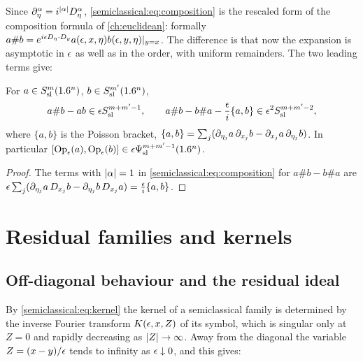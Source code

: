 Since $\partial^\alpha_\eta=i^{\lvert \alpha\rvert}D^\alpha_\eta$, \eqref{semiclassical:eq:composition}
is the rescaled form of the composition formula of \cref{ch:euclidean}:
formally $a\#b=e^{i\epsilon D_\eta\cdot D_y}a(\epsilon,x,\eta)b(\epsilon,y,\eta)|_{y=x}$. The
difference is that now the expansion is asymptotic in $\epsilon$ as well as in the
order, with uniform remainders. The two leading terms give:

\begin{corollary}\label{semiclassical:cor:commutator}
  For $a\in S^{m}_{\mathrm{sl}}(1.6^n)$, $b\in S^{m'}_{\mathrm{sl}}(1.6^n)$,
  \begin{equation*}
    a\#b-ab\in\epsilon S^{m+m'-1}_{\mathrm{sl}},\qquad
    a\#b-b\#a-\frac{\epsilon} i\{a,b\}\in\epsilon^2S^{m+m'-2}_{\mathrm{sl}},
  \end{equation*}
  where $\{a,b\}$ is the Poisson bracket,
  $\{a,b\}=\sum_j(\partial_{\eta_j}a\,\partial_{x_j}b-\partial_{x_j}a\,\partial_{\eta_j}b)$. In particular
  $[\operatorname{Op}_\epsilon(a),\operatorname{Op}_\epsilon(b)]\in\epsilon\Psi^{m+m'-1}_{\mathrm{sl}}(1.6^n)$.
\end{corollary}
\begin{proof}
  The terms with $\lvert \alpha\rvert=1$ in \eqref{semiclassical:eq:composition} for
  $a\#b-b\#a$ are $\epsilon\sum_j(\partial_{\eta_j}a\,D_{x_j}b-\partial_{\eta_j}b\,D_{x_j}a)
  =\frac{\epsilon} i\{a,b\}$.
\end{proof}

\section{Residual families and kernels}\label{semiclassical:sec:residual}

\subsection{Off-diagonal behaviour and the residual ideal}
By \eqref{semiclassical:eq:kernel} the kernel of a semiclassical family is
determined by the inverse Fourier transform $K(\epsilon,x,Z)$ of its symbol, which
is singular only at $Z=0$ and rapidly decreasing as $\lvert Z\rvert\to\infty$. Away
from the diagonal the variable $Z=(x-y)/\epsilon$ tends to infinity as
$\epsilon\downarrow0$, and this gives:

